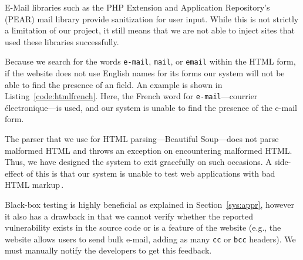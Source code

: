         E-Mail libraries such as the PHP Extension and Application Repository's (PEAR) mail library provide sanitization for user input. While this is not strictly a limitation of our project, it still means that we are not able to inject sites that used these libraries successfully.

        Because we search for the words \texttt{e-mail}, \texttt{mail}, or \texttt{email} within the HTML form, if the website does not use English names for its forms our system will not be able to find the presence of an \email field. An example is shown in Listing~\ref{code:htmlfrench}. Here, the French word for \texttt{e-mail}---courrier électronique---is used, and our system is unable to find the presence of the e-mail form. 

        The parser that we use for HTML parsing---Beautiful Soup---does not parse malformed HTML and throws an exception on encountering malformed HTML. Thus, we have designed the system to exit gracefully on such occasions. A side-effect of this is that our system is unable to test web applications with bad HTML markup\,\footnotemark.


        Black-box testing is highly beneficial as explained in Section~\ref{sys:appr}, however it also has a drawback in that we cannot verify whether the reported vulnerability exists in the source code or is a feature of the website (e.g., the website allows users to send bulk e-mail, adding as many \texttt{cc} or \texttt{bcc} headers). We must manually notify the developers to get this feedback.



